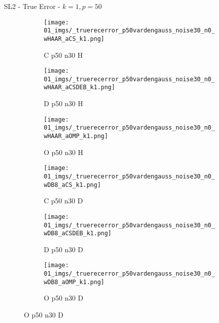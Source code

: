 \begin{frame}{SL2 - True Error - $k=1,p=50$}{}
\begin{figure}
\vspace{5pt}

\begin{subfigure}{0.13\textwidth}
\texttt{[image: 01\_imgs/\_truerecerror\_p50vardengauss\_noise30\_n0\_wHAAR\_aCS\_k1.png]}
\caption*{\tiny C p50 n30 H}
\end{subfigure}
\begin{subfigure}{0.13\textwidth}
\texttt{[image: 01\_imgs/\_truerecerror\_p50vardengauss\_noise30\_n0\_wHAAR\_aCSDEB\_k1.png]}
\caption*{\tiny D p50 n30 H}
\end{subfigure}
\begin{subfigure}{0.13\textwidth}
\texttt{[image: 01\_imgs/\_truerecerror\_p50vardengauss\_noise30\_n0\_wHAAR\_aOMP\_k1.png]}
\caption*{\tiny O p50 n30 H}
\end{subfigure}
\begin{subfigure}{0.13\textwidth}
\texttt{[image: 01\_imgs/\_truerecerror\_p50vardengauss\_noise30\_n0\_wDB8\_aCS\_k1.png]}
\caption*{\tiny C p50 n30 D}
\end{subfigure}
\begin{subfigure}{0.13\textwidth}
\texttt{[image: 01\_imgs/\_truerecerror\_p50vardengauss\_noise30\_n0\_wDB8\_aCSDEB\_k1.png]}
\caption*{\tiny D p50 n30 D}
\end{subfigure}
\begin{subfigure}{0.13\textwidth}
\texttt{[image: 01\_imgs/\_truerecerror\_p50vardengauss\_noise30\_n0\_wDB8\_aOMP\_k1.png]}
\caption*{\tiny O p50 n30 D}
\end{subfigure}
\end{figure}
\end{frame}


